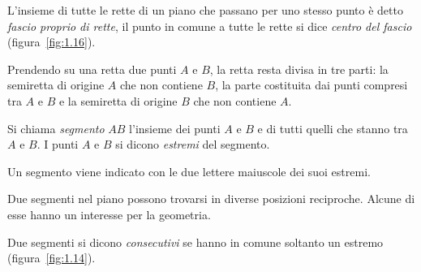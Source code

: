 \begin{definizione}
L'insieme di tutte le rette di un piano che passano per uno stesso 
punto è detto \emph{fascio proprio di rette}, il punto in comune a 
tutte le rette si dice \emph{centro del fascio} 
(figura~\ref{fig:1.16}).
\end{definizione}

\begin{inaccessibleblock}
  \begin{center}
   
  \end{center}
\end{inaccessibleblock}

Prendendo su una retta due punti \(A\) e \(B\), la retta resta divisa in 
tre parti: la semiretta di origine \(A\) che non contiene \(B\), la parte 
costituita dai punti compresi tra \(A\) e \(B\) e la semiretta di origine 
\(B\) che non contiene \(A\).

\begin{definizione}
Si chiama \emph{segmento} \(AB\) l'insieme dei punti \(A\) e \(B\) e di 
tutti quelli che stanno tra \(A\) e \(B\).
I punti \(A\) e \(B\) si dicono \emph{estremi} del segmento.
\end{definizione}
Un segmento viene indicato con le due lettere maiuscole dei suoi estremi.

\begin{inaccessibleblock}
 \begin{center} \end{center}
\end{inaccessibleblock}

Due segmenti nel piano possono trovarsi in diverse posizioni 
reciproche. Alcune di esse hanno un interesse per la geometria.

\begin{definizione}
Due segmenti si dicono \emph{consecutivi} se hanno in comune soltanto 
un estremo (figura~\ref{fig:1.14}).
\end{definizione}

